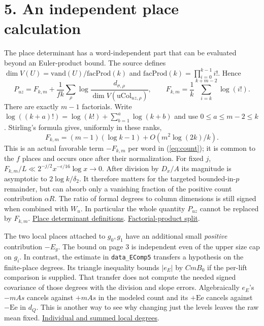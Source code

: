 \documentclass[11pt]{article}
\newcommand{\base}{https://github.com/Deicyde/riemann-hypothesis/blob/e7c8972c701d3396947808ab20cc16dc14623d33/src/}
\newcommand{\pin}[3]{\href{\base#1.lean\##2}{#3}}
\newcommand{\schur}{Formalism/SharpRestriction/GlobalSchurBounds/}
\begin{document}
\section*{5. An independent place calculation}
The place determinant has a word-independent part that can be evaluated beyond an Euler-product bound. The source defines $\dim V(U)=\mathrm{vand}(U)/\mathrm{facProd}(k)$ and $\mathrm{facProd}(k)=\prod_{i=0}^{k-1}i!$. Hence
\[
 P_{uz}=F_{k,m}+\frac1{fk}\sum_\rho\log\frac{d_{\sigma,\rho}}{\dim V(\mathrm{uCol}_{uz,\rho})},
 \qquad F_{k,m}=\frac1k\sum_{i=k}^{k+m-2}\log(i!).
\]
There are exactly $m-1$ factorials. Write $\log((k+a)!)=\log(k!)+\sum_{b=1}^a\log(k+b)$ and use $0\le a\le m-2\le k$. Stirling's formula gives, uniformly in these ranks,
\[
 F_{k,m}=(m-1)(\log k-1)+O(m^2\log(2k)/k).
\]
This is an actual favorable term $-F_{k,m}$ per word in (\ref{eq:count}); it is common to the $f$ places and occurs once after their normalization. For fixed $j$, $F_{k,m}/L\ll 2^{-j/2}x^{-\epsilon/16}\log x\to0$. After division by $D_x/A$ its magnitude is asymptotic to $2\log k/\delta_2$. It therefore matters for the targeted bounded-in-$p$ remainder, but can absorb only a vanishing fraction of the positive count contribution $\alpha R$. The ratio of formal degrees to column dimensions is still signed when combined with $W_u$. In particular the whole quantity $P_{uz}$ cannot be replaced by $F_{k,m}$.
\pin{\schur GeneralLinearActions/GapAtLeast}{L24-L31}{Place determinant definitions}.
\pin{\schur GlobalRankLatticeProofs/LogFactorialProductDifference}{L62-L85}{Factorial-product split}.

The two local places attached to $g_0,g_1$ have an additional small \emph{positive} contribution $-E_g$. The bound on page 3 is independent even of the upper size cap on $g_i$. In contrast, the estimate in \texttt{data\_EComp5} transfers a hypothesis on the finite-place degrees. Its triangle inequality bounds $|e_E|$ by $C m B_0$ if the per-lift comparison is supplied. That transfer does not compute the needed signed covariance of those degrees with the division and slope errors. Algebraically $e_E$'s $-mAs$ cancels against $+mAs$ in the modeled count and its $+\mathrm{Ee}$ cancels against $-\mathrm{Ee}$ in $d_Q$. This is another way to see why changing just the levels leaves the raw mean fixed.
\pin{\schur QuadraticLogDerivCongr}{L594-L624}{Individual and summed local degrees}.
\end{document}
